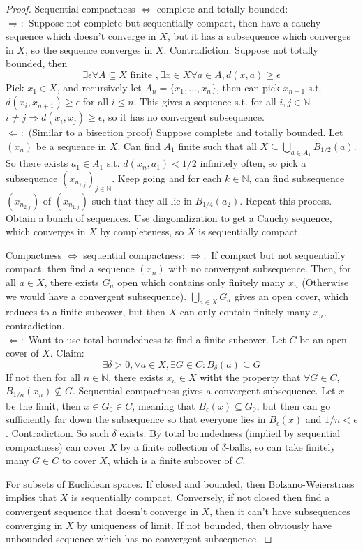 \documentclass{article}
\theoremstyle{definition}
\theoremstyle{remark}
\theoremstyle{plain}
\theoremstyle{definition}
\newcommand{\NN}{\mathbb{N}}
\begin{document}
\begin{proof}
    Sequential compactness $\Leftrightarrow$ complete and totally bounded:\\
    $\Rightarrow:$ Suppose not complete but sequentially compact, then have a cauchy sequence which doesn't converge in $X$, but it has a subsequence which converges in $X$, so the sequence converges in $X$. Contradiction. Suppose not totally bounded, then 
    \[\exists \epsilon \forall A\subseteq X \text{ finite }, \exists x\in X \forall a\in A, d(x,a)\ge \epsilon\]
    Pick $x_1\in X$, and recursively let $A_n=\{x_1,\ldots,x_n\}$, then can pick $x_{n+1}$ s.t. $d(x_i,x_{n+1})\ge\epsilon$ for all $i\le n$. This gives a sequence s.t. for all $i,j\in\NN$ $i\neq j\Rightarrow d(x_i,x_j)\ge \epsilon$, so it has no convergent subsequence.\\
    $\Leftarrow:$ (Similar to a bisection proof) Suppose complete and totally bounded. Let $(x_n)$ be a sequence in $X$. Can find $A_1$ finite such that all $X\subseteq \bigcup_{a\in A_1}B_{1/2}(a)$. So there exists $a_1\in A_1$ s.t. $d(x_n,a_1)<1/2$ infinitely often, so pick a subsequence $(x_{n_{1,j}})_{j\in\NN}$. Keep going and for each $k\in\NN$, can find subsequence $(x_{n_{2,j}})$ of $(x_{n_{1,j}})$ such that they all lie in $B_{1/4}(a_2)$. Repeat this process. Obtain a bunch of sequences. Use diagonalization to get a Cauchy sequence, which converges in $X$ by completeness, so $X$ is sequentially compact.

    Compactness $\Leftrightarrow$ sequential compactness:
    $\Rightarrow:$ If compact but not sequentially compact, then find a sequence $(x_n)$ with no convergent subsequence. Then, for all $a\in X$, there exists $G_a$ open which contains only finitely many $x_n$ (Otherwise we would have a convergent subsequence). $\bigcup_{a\in X}G_a$ gives an open cover, which reduces to a finite subcover, but then $X$ can only contain finitely many $x_n$, contradiction.\\
    $\Leftarrow:$ Want to use total boundedness to find a finite subcover. Let $C$ be an open cover of $X$. Claim: 
    \[\exists\delta>0,\forall a\in X,\exists G\in C: B_\delta(a)\subseteq G\]
    If not then for all $n\in\NN$, there exists $x_n\in X$ witht the property that $\forall G\in C$, $B_{1/n}(x_n)\not\subseteq G$. Sequential compactness gives a convergent subsequence. Let $x$ be the limit, then $x\in G_0\in C$, meaning that $B_{\epsilon}(x)\subseteq G_0$, but then can go sufficiently far down the subsequence so that everyone lies in $B_{\epsilon}(x)$ and $1/n<\epsilon$. Contradiction. So such $\delta$ exists. By total boundedness (implied by sequential compactness) can cover $X$ by a finite collection of $\delta$-balls, so can take finitely many $G\in C$ to cover $X$, which is a finite subcover of $C$.

    For subsets of Euclidean spaces. If closed and bounded, then Bolzano-Weierstrass implies that $X$ is sequentially compact. Conversely, if not closed then find a convergent sequence that doesn't converge in $X$, then it can't have subsequences converging in $X$ by uniqueness of limit. If not bounded, then obviously have unbounded sequence which has no convergent subsequence.
\end{proof}
\end{document}
